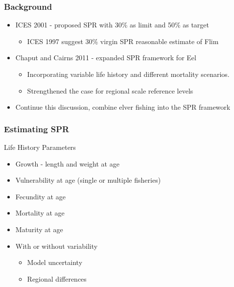 \documentclass{beamer}
\begin{document}
\begin{frame}
\frametitle{Background}
%
\begin{itemize}
	\item ICES 2001 - proposed SPR with 30\% as limit and 50\% as target
		\begin{itemize}
			\item ICES 1997 suggest 30\% virgin SPR reasonable estimate of Flim
		\end{itemize}
	\item Chaput and Cairns 2011 - expanded SPR framework for Eel
	\begin{itemize}
		\item Incorporating variable life history and different mortality scenarios.
		\item Strengthened the case for regional scale reference levels
	\end{itemize}
\item Continue this discussion, combine elver fishing into the SPR framework
\end{itemize}

\end{frame}
%

\begin{frame}
	\frametitle{Estimating SPR}
	\begin{block}{Life History Parameters}
	\begin{itemize}
		\item Growth - length and weight at age
		\item Vulnerability at age (single or multiple fisheries)
		\item Fecundity at age
		\item Mortality at age 
		\item Maturity at age
		\item With or without variability
			\begin{itemize}
				\item Model uncertainty
				\item Regional differences
			\end{itemize}
	\end{itemize}
	\end{block}

\end{frame}
\end{document}
